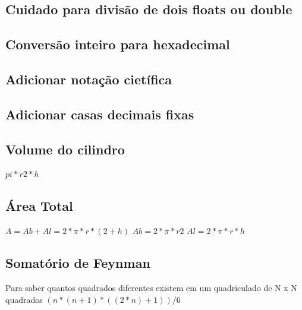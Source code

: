 \documentclass[a4paper,12pt]{article}
\begin{document}

\subsection{Cuidado para divisão de dois floats ou double}


\subsection{Conversão inteiro para hexadecimal}


\subsection{Adicionar notação cietífica}


\subsection{Adicionar casas decimais fixas}


\subsection{Volume do cilindro}

\(pi * r2 * h\)

\subsection{Área Total}

\(A = Ab + Al = 2*\pi*r*(2+h)\) \newline
\(Ab = 2*\pi*r2\) \newline
\(Al = 2*\pi*r*h\)

\subsection{Somatório de Feynman}
Para saber quantos quadrados diferentes existem em um quadriculado de N x N quadrados \newline
\((n*(n+1)*((2*n)+1))/6\)
\end{document}
